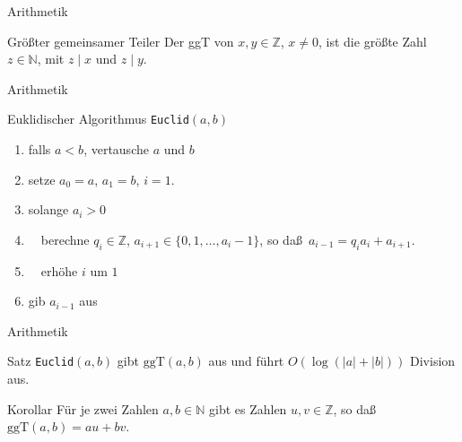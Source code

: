 \documentclass[aspectratio=1610, 11pt]{beamer}
\newcommand\NN{\mathbb N}
\newcommand\ZZ{\mathbb Z}
\newcommand{\ggt}{\mathrm{ggT}}
\begin{document}
\begin{frame}{Arithmetik}
	\begin{exampleblock}{Gr\"o\ss ter gemeinsamer Teiler}
		Der ggT von $x,y\in\ZZ$, $x\neq0$, ist die gr\"o\ss te Zahl $z\in\NN$, mit $z\mid x$ und $z\mid y$.
	\end{exampleblock}
\end{frame}

\begin{frame}{Arithmetik}
	\begin{exampleblock}{Euklidischer Algorithmus {\tt Euclid}$(a,b)$}
		\begin{enumerate}
			\item falls $a<b$, vertausche $a$ und $b$
			\item setze $a_0=a$, $a_1=b$, $i=1$.
			\item solange $a_i>0$
			\item $\quad$berechne $q_i\in\ZZ$, $a_{i+1}\in\{0,1,\ldots,a_i-1\}$, so da\ss\ $a_{i-1}=q_ia_i+a_{i+1}$.
			\item $\quad$erh\"ohe $i$ um $1$
			\item gib $a_{i-1}$ aus
		\end{enumerate}
	\end{exampleblock}
\end{frame}

\begin{frame}{Arithmetik}
	\begin{block}{Satz}
		{\tt Euclid}$(a,b)$ gibt $\ggt(a,b)$ aus und f\"uhrt $O(\log(|a|+|b|))$ Division aus.
	\end{block}
	\begin{block}{Korollar}
		F\"ur je zwei Zahlen $a,b\in\NN$ gibt es Zahlen $u,v\in\ZZ$, so da\ss\ $\ggt(a,b)=au+bv$.
	\end{block}
\end{frame}
\end{document}
